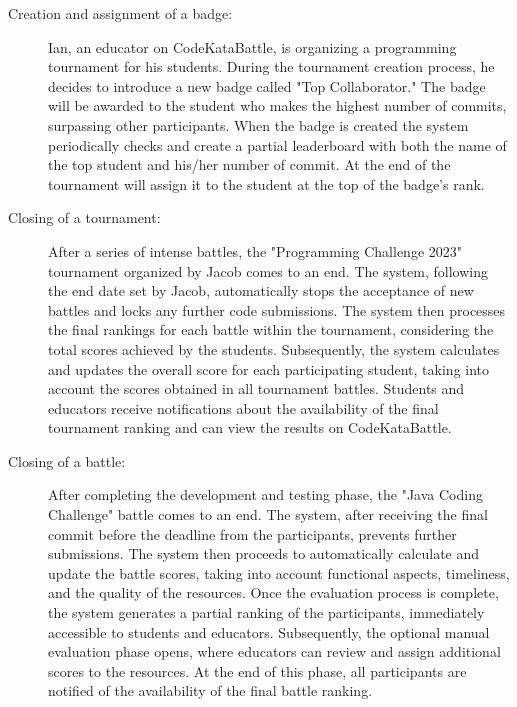 \documentclass{article}
\begin{document}
\begin{description}
                    \item [Creation and assignment of a badge:]
                    
                     Ian, an educator on CodeKataBattle, is organizing a programming tournament for his students. During the tournament creation process, he decides to introduce a new badge called "Top Collaborator." The badge will be awarded to the student who makes the highest number of commits, surpassing other participants. When the badge is created the system periodically checks and create a partial leaderboard with both the name of the top student and his/her number of commit. At the end of the tournament will assign it to the student at the top of the badge's rank.
                     
                \item[Closing of a tournament:]
                    After a series of intense battles, the "Programming Challenge 2023" tournament organized by Jacob comes to an end. The system, following the end date set by Jacob, automatically stops the acceptance of new battles and locks any further code submissions. The system then processes the final rankings for each battle within the tournament, considering the total scores achieved by the students. Subsequently, the system calculates and updates the overall score for each participating student, taking into account the scores obtained in all tournament battles. Students and educators receive notifications about the availability of the final tournament ranking and can view the results on CodeKataBattle.
                
                \item[Closing of a battle:]

                 After completing the development and testing phase, the "Java Coding Challenge" battle comes to an end. The system, after receiving the final commit before the deadline from the participants, prevents further submissions. The system then proceeds to automatically calculate and update the battle scores, taking into account functional aspects, timeliness, and the quality of the resources. Once the evaluation process is complete, the system generates a partial ranking of the participants, immediately accessible to students and educators. Subsequently, the optional manual evaluation phase opens, where educators can review and assign additional scores to the resources. At the end of this phase, all participants are notified of the availability of the final battle ranking.
                        
                \end{description}
\end{document}
